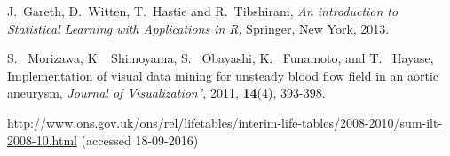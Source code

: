 \documentclass[a4paper,amsmath, 12pt]{article}
\begin{document}
\begin{thebibliography}{100}

J.~Gareth, D.~Witten, T.~Hastie and R.~Tibshirani, \textsl{An introduction to Statistical Learning with Applications in R}, Springer, New York, 2013.

S.~ Morizawa, K.~ Shimoyama, S.~ Obayashi, K.~ Funamoto, and T.~ Hayase,
Implementation of visual data mining for unsteady blood flow field in an aortic aneurysm,
\textsl{Journal of Visualization"}, 2011, {\bf 14}(4), 393-398.

 \url{http://www.ons.gov.uk/ons/rel/lifetables/interim-life-tables/2008-2010/sum-ilt-2008-10.html} (accessed 18-09-2016)

\end{thebibliography}
\end{document}
